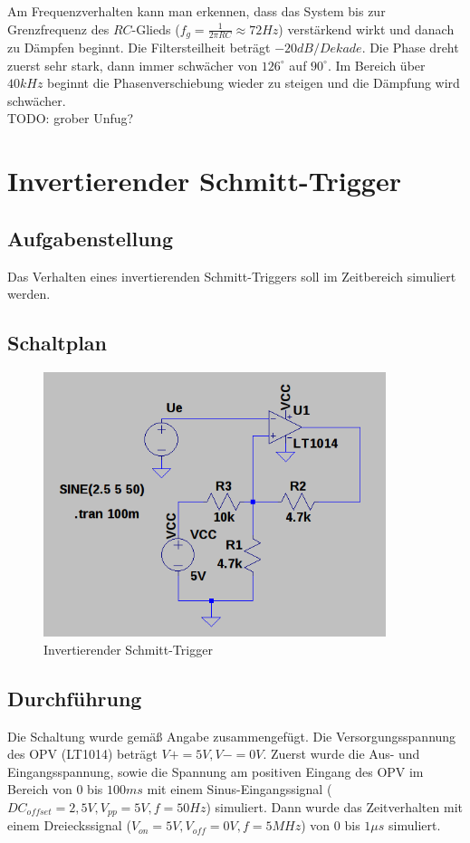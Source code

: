\documentclass[12pt,a4paper,titlepage]{article}
\begin{document}
\noindent Am Frequenzverhalten kann man erkennen, dass das System bis zur Grenzfrequenz des $RC$-Glieds ($f_g = \frac{1}{2\pi RC} \approx 72Hz$) verst\"arkend wirkt und danach zu D\"ampfen beginnt. Die Filtersteilheit betr\"agt $-20dB/Dekade$. Die Phase dreht zuerst sehr stark, dann immer schw\"acher von $126^{\circ}$ auf $90^{\circ}$. Im Bereich \"uber $40kHz$ beginnt die Phasenverschiebung wieder zu steigen und die D\"ampfung wird schw\"acher.\\

\noindent TODO: grober Unfug?

\section{Invertierender Schmitt-Trigger}

\subsection{Aufgabenstellung}
Das Verhalten eines invertierenden Schmitt-Triggers soll im Zeitbereich simuliert werden.

\subsection{Schaltplan}
\begin{figure}[H]
  \centering
  \includegraphics[width=100mm]{schmitt_schaltung.png}
  \caption{Invertierender Schmitt-Trigger}
\end{figure}

\subsection{Durchf\"uhrung}
Die Schaltung wurde gem\"aß Angabe zusammengef\"ugt. Die Versorgungsspannung des OPV (LT1014) betr\"agt $V+=5V,V-=0V$. Zuerst wurde die Aus- und Eingangsspannung, sowie die Spannung am positiven Eingang des OPV im Bereich von $0$ bis $100ms$ mit einem Sinus-Eingangssignal ($DC_{offset} = 2,5V, V_{pp} = 5V, f = 50Hz$) simuliert. Dann wurde das Zeitverhalten mit einem Dreieckssignal ($V_{on} = 5V, V_{off} = 0V, f = 5MHz$) von $0$ bis $1\mu s$ simuliert.
\end{document}

